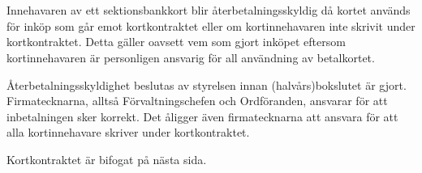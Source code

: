 \documentclass[10pt]{article}
\begin{document}
    \section*{\doctitle}

    Innehavaren av ett sektionsbankkort blir återbetalningsskyldig då kortet används för inköp som går emot kortkontraktet eller om kortinnehavaren inte skrivit under kortkontraktet. Detta gäller oavsett vem som gjort inköpet eftersom kortinnehavaren är personligen ansvarig för all användning av betalkortet.

    Återbetalningsskyldighet beslutas av styrelsen innan (halvårs)bokslutet är gjort. Firmatecknarna, alltså Förvaltningschefen och Ordföranden, ansvarar för att inbetalningen sker korrekt. Det åligger även firmatecknarna att ansvara för att alla kortinnehavare skriver under kortkontraktet.

    Kortkontraktet är bifogat på nästa sida.

    
\end{document}
